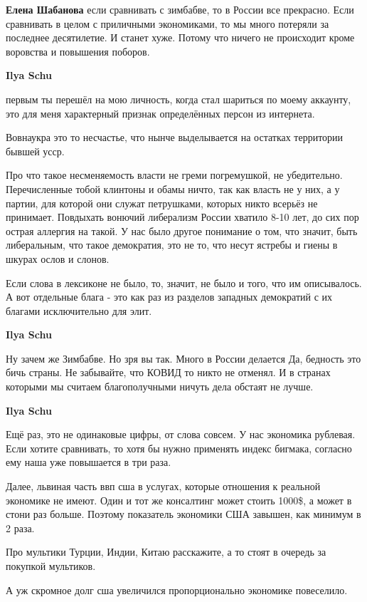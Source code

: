 \begin{itemize}
\begin{itemize}
\textbf{Елена Шабанова} если сравнивать с зимбабве, то в России все прекрасно. Если сравнивать в целом с приличными экономиками, то мы много потеряли за последнее десятилетие. И станет хуже. Потому что ничего не происходит кроме воровства и повышения поборов.

\textbf{Ilya Schu} 

первым ты перешёл на мою личность, когда стал шариться по моему аккаунту, это
для меня характерный признак определённых персон из интернета.

Вовнаукра это то несчастье, что нынче выделывается на остатках территории
бывшей усср.

Про что такое несменяемость власти не греми погремушкой, не убедительно.
Перечисленные тобой клинтоны и обамы ничто, так как власть не у них, а у
партии, для которой они служат петрушками, которых никто всерьёз не принимает.
Повдыхать вонючий либерализм России хватило 8-10 лет, до сих пор острая
аллергия на такой. У нас было другое понимание о том, что значит, быть
либеральным, что такое демократия, это не то, что несут ястребы и гиены в
шкурах ослов и слонов.

Если слова в лексиконе не было, то, значит, не было и того, что им описывалось.
А вот отдельные блага - это как раз из разделов западных демократий с их
благами исключительно для элит.


\textbf{Ilya Schu} 

Ну зачем же Зимбабве. Но зря вы так. Много в России делается Да, бедность это бичь
страны. Не забывайте, что КОВИД то никто не отменял. И в странах которыми мы
считаем благополучными ничуть дела обстаят не лучше.

\textbf{Ilya Schu}

Ещё раз, это не одинаковые цифры, от слова совсем. У нас экономика рублевая.
Если хотите сравнивать, то хотя бы нужно применять индекс бигмака, согласно ему
наша уже повышается в три раза.

Далее, львиная часть ввп сша в услугах, которые отношения к реальной экономике
не имеют. Один и тот же консалтинг может стоить 1000\$, а может в стони раз
больше. Поэтому показатель экономики США завышен, как минимум в 2 раза.

Про мультики Турции, Индии, Китаю расскажите, а то стоят в очередь за покупкой
мультиков.

А уж скромное долг сша увеличился пропорционально экономике повеселило.


\end{itemize}
\end{itemize}
